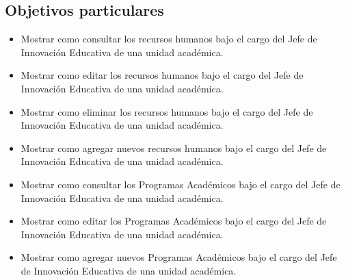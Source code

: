     \subsection{Objetivos particulares}
    \begin{itemize}
        \item Mostrar como consultar los recursos humanos bajo el cargo del Jefe de Innovación Educativa de una unidad académica.
        \item Mostrar como editar los recursos humanos bajo el cargo del Jefe de Innovación Educativa de una unidad académica.
        \item Mostrar como eliminar los recursos humanos bajo el cargo del Jefe de Innovación Educativa de una unidad académica.
        \item Mostrar como agregar nuevos recursos humanos bajo el cargo del Jefe de Innovación Educativa de una unidad académica.
         \item Mostrar como consultar los Programas Académicos bajo el cargo del Jefe de Innovación Educativa de una unidad académica.
        \item Mostrar como editar los Programas Académicos bajo el cargo del Jefe de Innovación Educativa de una unidad académica.
        \item Mostrar como agregar nuevos Programas Académicos bajo el cargo del Jefe de Innovación Educativa de una unidad académica.
    \end{itemize}
